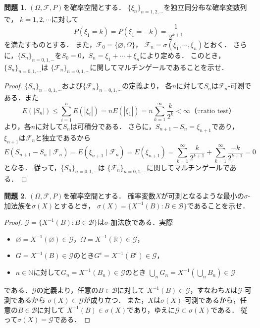 \documentclass{jsarticle}
\theoremstyle{definition}
\newtheorem{qst}{問題}
\begin{document}
\begin{qst}
$(\Omega,\mathcal{F},P)$を確率空間とする．
$\{\xi_n\}_{n=1,2,\cdots}$を独立同分布な確率変数列で，
$k=1,2,\cdots$に対して
\[ P(\xi_1=k)=P(\xi_1=-k)=\frac{1}{2^{k+1}} \]
を満たすものとする．
また，$\mathcal{F}_0=\{\varnothing,\Omega\}$，
$\mathcal{F}_n=\sigma(\xi_1,\cdots,\xi_n)$とおく．
さらに，$\{S_n\}_{n=0,1,\cdots}$を$S_0=0$，$S_n=\xi_1+\cdots+\xi_n$により定める．
このとき，$\{S_n\}_{n=0,1,\cdots}$は
$\{\mathcal{F}_n\}_{n=0,1,\cdots}$に関してマルチンゲールであることを示せ．
\end{qst}
\begin{proof}
$\{S_n\}_{n=0,1,\cdots}$および$\{\mathcal{F}_n\}_{n=0,1,\cdots}$の定義より，
各$n$に対して$S_n$は$\mathcal{F}_n$-可測である．また
\[ E(|S_n|)\leq\sum_{i=1}^nE(|\xi_i|)
=nE(|\xi_1|)=n\sum_{k=1}^\infty\frac{k}{2^k}<\infty
（\because\text{ratio test}） \]
より，各$n$に対して$S_n$は可積分である．
さらに，$S_{n+1}-S_n=\xi_{n+1}$であり，
$\xi_{n+1}$は$\mathcal{F}_n$と独立であるから
\[ E(S_{n+1}-S_n\mid\mathcal{F}_n)=
E(\xi_{n+1}\mid\mathcal{F}_n)=E(\xi_{n+1})
=\sum_{k=1}^\infty\frac{k}{2^{k+1}}+\sum_{k=1}^\infty\frac{-k}{2^{k+1}}
=0 \]
となる．
従って，$\{S_n\}_{n=0,1,\cdots}$は
$\{\mathcal{F}_n\}_{n=0,1,\cdots}$に関してマルチンゲールである．
\end{proof}

\begin{qst}
$(\Omega,\mathcal{F},P)$を確率空間とする．
確率変数$X$が可測となるような最小の$\sigma$-加法族を$\sigma(X)$とするとき，
$\sigma(X)=\{X^{-1}(B):B\in\mathcal{B}\}$であることを示せ．
\end{qst}
\begin{proof}
$\mathcal{G}=\{X^{-1}(B):B\in\mathcal{B}\}$は$\sigma$-加法族である．実際
\begin{itemize}
\item$\varnothing=X^{-1}(\varnothing)\in\mathcal{G}$，$\Omega=X^{-1}(\mathbb{R})\in\mathcal{G}$，
\item$G=X^{-1}(B)\in\mathcal{G}$のとき$G^c=X^{-1}(B^c)\in\mathcal{G}$，
\item$n\in\mathbb{N}$に対して$G_n=X^{-1}(B_n)\in\mathcal{G}$のとき
$\bigcup_nG_n=X^{-1}(\bigcup_nB_n)\in\mathcal{G}$
\end{itemize}
である．$\mathcal{G}$の定義より，任意の$B\in\mathcal{B}$に対して
$X^{-1}(B)\in\mathcal{G}$，すなわち$X$は$\mathcal{G}$-可測であるから
$\sigma(X)\subset\mathcal{G}$が成り立つ．
また，$X$は$\sigma(X)$-可測であるから，任意の$B\in\mathcal{B}$に対して
$X^{-1}(B)\in\sigma(X)$であり，ゆえに$\mathcal{G}\subset\sigma(X)$である．
従って$\sigma(X)=\mathcal{G}$である．
\end{proof}
\end{document}
